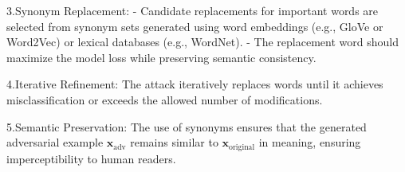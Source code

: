 3.Synonym Replacement:
   - Candidate replacements for important words are selected from synonym sets generated using word embeddings (e.g., GloVe or Word2Vec) or lexical databases (e.g., WordNet).
   - The replacement word should maximize the model loss while preserving semantic consistency.

4.Iterative Refinement: The attack iteratively replaces words until it achieves misclassification or exceeds the allowed number of modifications.

5.Semantic Preservation: The use of synonyms ensures that the generated adversarial example $\mathbf{x}_{\text{adv}}$ remains similar to $\mathbf{x}_{\text{original}}$ in meaning, ensuring imperceptibility to human readers.


